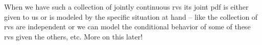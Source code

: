 \documentclass[12pt]{article}
\begin{document}
\noindent When we have such a collection of jointly continuous rvs its joint pdf is either given to us or is modeled by the specific situation at hand -- like
the collection of rvs are independent or we can model the conditional behavior of some of these rvs given the others, etc. More on this later!\\


\newpage















\end{document}
